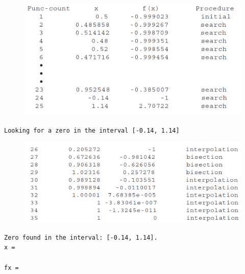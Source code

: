 \documentclass[../main.tex]{subfiles}
\begin{document}
\begin{example}
    
    \begin{figure}[h]
        \includegraphics[width=0.6\linewidth]{./images/example_6_7_1}
    \end{figure}

    \texttt{Looking for a zero in the interval [-0.14, 1.14]}\\

    \begin{figure}[h]
        \includegraphics[width=0.6\linewidth]{./images/example_6_7_2}
    \end{figure}

    \texttt{Zero found in the interval: [-0.14, 1.14].\\
    \indent x =\\
    \indent{}\\
    \indent fx =\\
    \indent{}\\}


\end{example}
\end{document}
